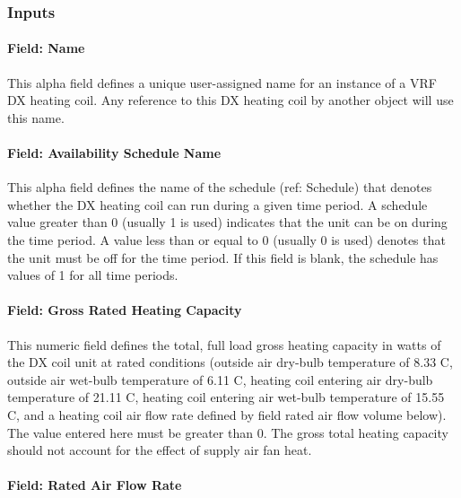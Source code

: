 \subsubsection{Inputs}\label{inputs-7-010}

\paragraph{Field: Name}\label{field-name-6-007}

This alpha field defines a unique user-assigned name for an instance of a VRF DX heating coil. Any reference to this DX heating coil by another object will use this name.

\paragraph{Field: Availability Schedule Name}\label{field-availability-schedule-name-2-004}

This alpha field defines the name of the schedule (ref: Schedule) that denotes whether the DX heating coil can run during a given time period. A schedule value greater than 0 (usually 1 is used) indicates that the unit can be on during the time period. A value less than or equal to 0 (usually 0 is used) denotes that the unit must be off for the time period. If this field is blank, the schedule has values of 1 for all time periods.

\paragraph{Field: Gross Rated Heating Capacity}\label{field-gross-rated-heating-capacity-1}

This numeric field defines the total, full load gross heating capacity in watts of the DX coil unit at rated conditions (outside air dry-bulb temperature of 8.33 C, outside air wet-bulb temperature of 6.11 C, heating coil entering air dry-bulb temperature of 21.11 C, heating coil entering air wet-bulb temperature of 15.55 C, and a heating coil air flow rate defined by field rated air flow volume below). The value entered here must be greater than 0. The gross total heating capacity should not account for the effect of supply air fan heat.

\paragraph{Field: Rated Air Flow Rate}\label{field-rated-air-flow-rate-1}

